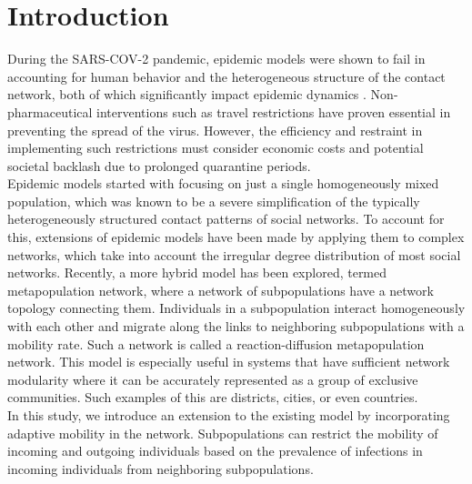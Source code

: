 \section{Introduction}

During the SARS-COV-2 pandemic, epidemic models were shown to fail in accounting for human behavior and the heterogeneous structure of the contact network, both of which significantly impact epidemic dynamics \cite{Lewis2021wrong}. Non-pharmaceutical interventions such as travel restrictions have proven essential in preventing the spread of the virus. However, the efficiency and restraint in implementing such restrictions must consider economic costs and potential societal backlash due to prolonged quarantine periods.
\\
Epidemic models started with focusing on just a single homogeneously mixed population, which was known to be a severe simplification of the typically heterogeneously structured contact patterns of social networks. To account for this, extensions of epidemic models have been made by applying them to complex networks, which take into account the irregular degree distribution of most social networks. Recently, a more hybrid model has been explored, termed metapopulation network, where a network of subpopulations have a network topology connecting them. Individuals in a subpopulation interact homogeneously with each other and migrate along the links to neighboring subpopulations with a mobility rate. Such a network is called a reaction-diffusion metapopulation network. This model is especially useful in systems that have sufficient network modularity where it can be accurately represented as a group of exclusive communities. Such examples of this are districts, cities, or even countries. 
\\
In this study, we introduce an extension to the existing model by incorporating adaptive mobility in the network. Subpopulations can restrict the mobility of incoming and outgoing individuals based on the prevalence of infections in incoming individuals from neighboring subpopulations.
